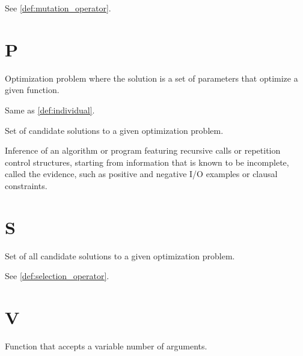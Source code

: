     \begin{definition}[Mutator]
    \label{def:mutator}
      See \vref{def:mutation_operator}.
    \end{definition}

  \section*{P}
    \begin{definition}
    \label{def:parameter_optimization}
      Optimization problem where the solution is a set of parameters that 
      optimize a given function.
    \end{definition}

    \begin{definition}[Phenotype]
    \label{def:phenotype}
      Same as \vref{def:individual}.
    \end{definition}

    \begin{definition}[Population]
    \label{def:population}
      Set of candidate solutions to a given optimization problem.
    \end{definition}

    \begin{definition}
    \label{def:program_induction}
      Inference of an algorithm or program featuring recursive calls or 
      repetition control structures, starting from information that is known to 
      be incomplete, called the evidence, such as positive and negative I/O 
      examples or clausal constraints.
    \end{definition}

  \section*{S}
    \begin{definition}
    \label{def:search_space}
      Set of all candidate solutions to a given optimization problem.
    \end{definition}

    \begin{definition}[Selector]
      See \vref{def:selection_operator}.
    \end{definition}

  \section*{V}
    \begin{definition}
    \label{def:variadic_function}
      Function that accepts a variable number of arguments.  
    \end{definition}
